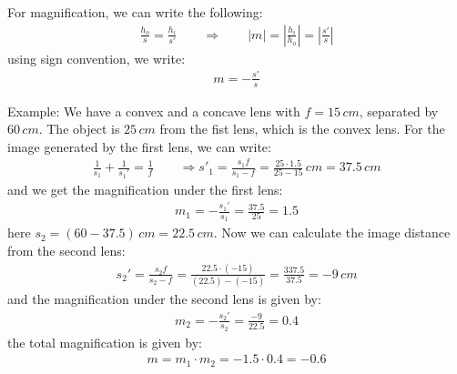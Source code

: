 \documentclass[11pt]{book}
\theoremstyle{break}
\theoremstyle{break}
\newcommand{\example}{\color{green}Example: \color{black}}
\begin{document}
For magnification, we can write the following:
\begin{align*}
\frac{h_o}{s}=\frac{h_i}{s'} \qquad \Rightarrow \qquad |m| =\left|\frac{h_i}{h_o}\right| =\left|\frac{s'}{s}\right|
\end{align*}
using sign convention, we write:
\begin{align}
m = -\frac{s'}{s}
\end{align}

\example We have a convex and a concave lens with $f = 15\, cm$, separated by $60\, cm$. The object is $25\, cm$ from the fist lens, which is the convex lens. For the image generated by the first lens, we can write:
\begin{align*}
\frac{1}{s_1}+ \frac{1}{s_1'} = \frac{1}{f} \qquad \Rightarrow s'_1 = \frac{s_1 f}{s_1- f} = \frac{25\cdot 1.5}{25-15}\, cm = 37.5\, cm
\end{align*}
and we get the magnification under the first lens:
\begin{align*}
m_1 =- \frac{s_1'}{s_1} = \frac{37.5}{25} = 1.5
\end{align*}
here $s_2 = (60-37.5) \, cm = 22.5\, cm$. Now we can calculate the image distance from the second lens:
\begin{align*}
s_2' = \frac{s_2 f}{s_2 - f} = \frac{22.5 \cdot (-15)}{(22.5)-(-15)} = \frac{337.5}{37.5} = -9\, cm
\end{align*}
and the magnification under the second lens is given by:
\begin{align*}
m_2 = -\frac{s_2'}{s_2} = \frac{-9}{22.5} = 0.4
\end{align*}
the total magnification is given by:
\begin{align*}
m = m_1 \cdot m_2 = -1.5\cdot 0.4 = -0.6
\end{align*}


\newpage
\end{document}
